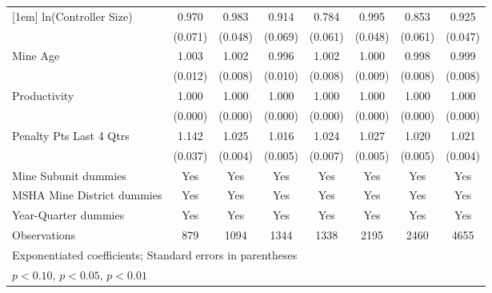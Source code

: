 {\begin{tabular}{l*{7}{c}}
[1em]
ln(Controller Size)      &       0.970         &       0.983         &       0.914         &       0.784\sym{***}&       0.995         &       0.853\sym{**} &       0.925         \\
                         &     (0.071)         &     (0.048)         &     (0.069)         &     (0.061)         &     (0.048)         &     (0.061)         &     (0.047)         \\
[1em]
Mine Age                 &       1.003         &       1.002         &       0.996         &       1.002         &       1.000         &       0.998         &       0.999         \\
                         &     (0.012)         &     (0.008)         &     (0.010)         &     (0.008)         &     (0.009)         &     (0.008)         &     (0.008)         \\
[1em]
Productivity             &       1.000         &       1.000         &       1.000         &       1.000         &       1.000         &       1.000         &       1.000         \\
                         &     (0.000)         &     (0.000)         &     (0.000)         &     (0.000)         &     (0.000)         &     (0.000)         &     (0.000)         \\
[1em]
Penalty Pts Last 4 Qtrs  &       1.142\sym{***}&       1.025\sym{***}&       1.016\sym{***}&       1.024\sym{***}&       1.027\sym{***}&       1.020\sym{***}&       1.021\sym{***}\\
                         &     (0.037)         &     (0.004)         &     (0.005)         &     (0.007)         &     (0.005)         &     (0.005)         &     (0.004)         \\
[1em]
Mine Subunit dummies     &         Yes         &         Yes         &         Yes         &         Yes         &         Yes         &         Yes         &         Yes         \\
[1em]
MSHA Mine District dummies&         Yes         &         Yes         &         Yes         &         Yes         &         Yes         &         Yes         &         Yes         \\
[1em]
Year-Quarter dummies     &         Yes         &         Yes         &         Yes         &         Yes         &         Yes         &         Yes         &         Yes         \\
\hline
Observations             &         879         &        1094         &        1344         &        1338         &        2195         &        2460         &        4655         \\
\hline\hline
\multicolumn{8}{l}{\footnotesize Exponentiated coefficients; Standard errors in parentheses}\\
\multicolumn{8}{l}{\footnotesize \sym{*} \(p<0.10\), \sym{**} \(p<0.05\), \sym{***} \(p<0.01\)}\\
\end{tabular}
}
